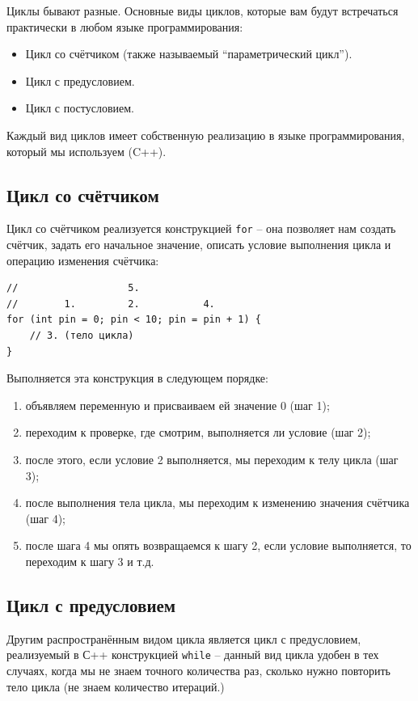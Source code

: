 \documentclass[a4paper,twoside]{book}
\begin{document}
Циклы бывают разные. Основные виды циклов, которые вам будут встречаться
практически в любом языке программирования:
\begin{itemize}
\item Цикл со счётчиком (также называемый ``параметрический цикл'').
\item Цикл с предусловием.
\item Цикл с постусловием.
\end{itemize}

Каждый вид циклов имеет собственную реализацию в языке программирования, который
мы используем (C++).

\subsection{Цикл со счётчиком}

Цикл со счётчиком реализуется конструкцией \texttt{for} -- она позволяет нам
создать счётчик, задать его начальное значение, описать условие выполнения цикла
и операцию изменения счётчика:

\begin{verbatim}
//                   5.
//        1.         2.           4.
for (int pin = 0; pin < 10; pin = pin + 1) {
    // 3. (тело цикла)
}
\end{verbatim}

Выполняется эта конструкция в следующем порядке:
\begin{enumerate}
\item объявляем переменную и присваиваем ей значение 0 (шаг 1);
\item переходим к проверке, где смотрим, выполняется ли условие (шаг 2);
\item после этого, если условие 2 выполняется, мы переходим к телу цикла (шаг 3);
\item после выполнения тела цикла, мы переходим к изменению значения счётчика (шаг 4);
\item после шага 4 мы опять возвращаемся к шагу 2, если условие выполняется, то
  переходим к шагу 3 и т.д.
\end{enumerate}

\subsection{Цикл с предусловием}

Другим распространённым видом цикла является цикл с предусловием, реализуемый в
С++ конструкцией \texttt{while} -- данный вид цикла удобен в тех случаях, когда
мы не знаем точного количества раз, сколько нужно повторить тело цикла (не знаем
количество итераций.)
\end{document}
